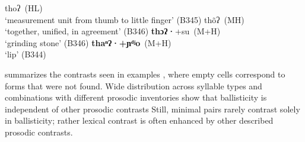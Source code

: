\documentclass[output=paper]{langscibook}
\begin{document}
\ea
{}
     {thoʔ~(HL) \\
          \glt ‘measurement unit from thumb to little finger’  (B345)
     }
     {thõʔ~(MH) \\
          \glt ‘together, unified, in agreement’  (B346)
     }
     {\textbf{thɔʔ·}+su~(M+H) \\
          \glt ‘grinding stone’  (B346)
     }
     {\textbf{thaⁿʔ·+ɲᵈʲo}~(M+H)\\
          \glt ‘lip’  (B344)
     }
\z




 summarizes the contrasts seen in examples , where empty cells correspond to forms that were not found. Wide distribution across syllable types and combinations with different prosodic
inventories show that ballisticity is independent of other prosodic contrasts Still, minimal pairs rarely contrast solely in ballisticity; rather lexical contrast is often enhanced by other described prosodic contrasts.
\end{document}
